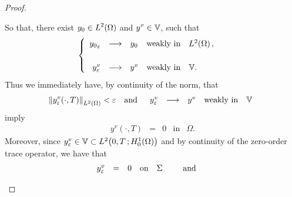 \begin{proof}
\begin{enumerate}
            So that, there exist $\displaystyle y_{0}\in L^{2}\!\left({\Omega}\right)$
            and $\displaystyle y^{v}\in \mathbb{V}$, such that
            \begin{equation*}\label{eq:proof-thm-controllability-44}
                \begin{cases}\displaystyle
                    \begin{array}{rclll}
                        {y_{0}}_{\varepsilon} & \longrightarrow & y_{0} &
                        \text{weakly in} & L^{2}\!\left({\Omega}\right),\\
                        \\
                        y_{\varepsilon}^{v} & \longrightarrow & y^{v} &
                        \text{weakly in} & \mathbb{V}.
                    \end{array}
                \end{cases}
            \end{equation*}
            Thus we immediately have, by continuity of the norm, that
            \begin{equation*}\label{eq:proof-thm-controllability-45}
                {\left\|{y_{\varepsilon}^{v}\!\left({\cdot,T}\right) }\right\|}_{L^{2}\left({\Omega}\right)} < \varepsilon
                \quad\text{and}\quad
                \begin{array}{rclll}
                    y_{\varepsilon}^{v} & \longrightarrow & y^{v} & \text{weakly
                    in} & \mathbb{V}
                \end{array}
            \end{equation*}
            imply%
            \begin{equation}\label{eq:proof-thm-controllability-46}
                \begin{array}{rclll}
                    y^{v}\!\left({\cdot, T}\right) & = & 0 & \text{in} &
                    \Omega.
                \end{array}
            \end{equation}
            Moreover, since $y_{\varepsilon}^{v}\in\mathbb{V}\subset
            L^{2}\!\left({0,T\,;H_{0}^{1}(\Omega)}\right)$ and by continuity of the
            zero-order trace operator, we have that
            \begin{equation*}
                \begin{array}{rclll}
                    y_{\veps}^{v} & = & 0 & \text{on} & \Sigma
                \end{array}
                \qquad\text{and}\qquad

\end{equation*}
\end{enumerate}
\end{proof}
